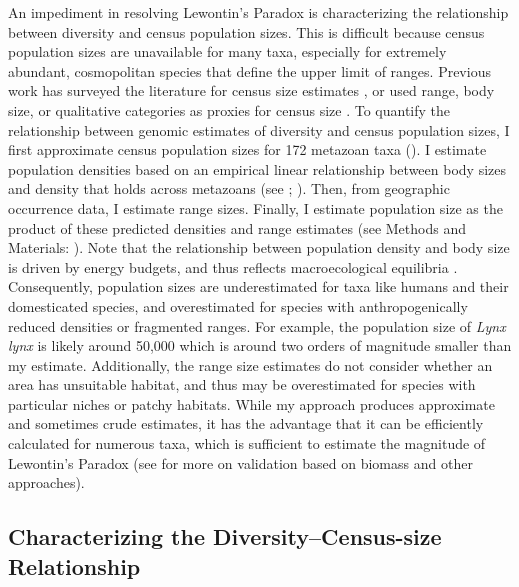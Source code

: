 \documentclass[9pt,lineno]{elife}
\begin{document}
An impediment in resolving Lewontin's Paradox is characterizing the
relationship between diversity and census population sizes. This is difficult
because census population sizes are unavailable for many taxa, especially for
extremely abundant, cosmopolitan species that define the upper limit of ranges.
Previous work has surveyed the literature for census size estimates
\citep{Nei1984-zi,Soule1976-he,Frankham1996-yb}, or used range, body size, or
qualitative categories as proxies for census size
\citep{Corbett-Detig2015-gt,Leffler2012-zj}. To quantify the relationship
between genomic estimates of diversity and census population sizes, I first
approximate census population sizes for 172 metazoan taxa (). I
estimate population densities based on an empirical linear relationship between
body sizes and density that holds across metazoans (see
; \cite{Damuth1981-st,Damuth1987-sg}). Then, from
geographic occurrence data, I estimate range sizes.  Finally, I estimate
population size as the product of these predicted densities and range estimates
(see Methods and Materials: ). Note that the
relationship between population density and body size is driven by energy
budgets, and thus reflects macroecological equilibria \citep{Damuth1987-sg}.
Consequently, population sizes are underestimated for taxa like humans and
their domesticated species, and overestimated for species with
anthropogenically reduced densities or fragmented ranges. For example, the
population size of \emph{Lynx lynx} is likely around 50,000 \citep{Iucn2020-ap}
which is around two orders of magnitude smaller than my estimate. Additionally,
the range size estimates do not consider whether an area has unsuitable
habitat, and thus may be overestimated for species with particular niches or
patchy habitats. While my approach produces approximate and sometimes crude
estimates, it has the advantage that it can be efficiently calculated for
numerous taxa, which is sufficient to estimate the magnitude of Lewontin's
Paradox (see  for more on validation based on
biomass and other approaches). 

\subsection{Characterizing the Diversity--Census-size Relationship}
\end{document}
